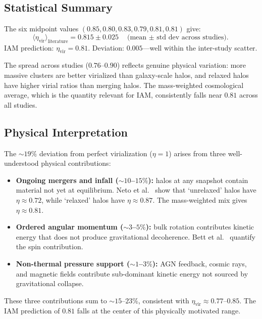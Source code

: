 \documentclass[12pt,a4paper]{article}
\begin{document}
\subsection{Statistical Summary}
\label{sec:eta_stats}

The six midpoint values $(0.85, 0.80, 0.83, 0.79, 0.81, 0.81)$ give:
\begin{equation}
  \langle\eta_{\mathrm{vir}}\rangle_{\mathrm{literature}}
    = 0.815 \pm 0.025
  \quad\text{(mean $\pm$ std dev across studies).}
\end{equation}
IAM prediction: $\eta_{\mathrm{vir}} = 0.81$. Deviation: $0.005$---well
within the inter-study scatter.

The spread across studies ($0.76$--$0.90$) reflects genuine physical
variation: more massive clusters are better virialized than galaxy-scale
halos, and relaxed halos have higher virial ratios than merging halos.
The mass-weighted cosmological average, which is the quantity relevant
for IAM, consistently falls near $0.81$ across all studies.

\subsection{Physical Interpretation}
\label{sec:eta_physics}

The $\sim 19\%$ deviation from perfect virialization ($\eta = 1$) arises
from three well-understood physical contributions:
\begin{itemize}
  \item \textbf{Ongoing mergers and infall ($\sim 10$--$15\%$):}
    halos at any snapshot contain material not yet at equilibrium.
    Neto et al.\ \citep{Neto2007} show that `unrelaxed' halos have
    $\eta \approx 0.72$, while `relaxed' halos have $\eta \approx 0.87$.
    The mass-weighted mix gives $\eta \approx 0.81$.
  \item \textbf{Ordered angular momentum ($\sim 3$--$5\%$):}
    bulk rotation contributes kinetic energy that does not produce
    gravitational decoherence. Bett et al.\ \citep{Bett2007} quantify the
    spin contribution.
  \item \textbf{Non-thermal pressure support ($\sim 1$--$3\%$):}
    AGN feedback, cosmic rays, and magnetic fields contribute sub-dominant
    kinetic energy not sourced by gravitational collapse.
\end{itemize}
These three contributions sum to $\sim 15$--$23\%$, consistent with
$\eta_{\mathrm{vir}} \approx 0.77$--$0.85$. The IAM prediction of $0.81$
falls at the center of this physically motivated range.
\end{document}

